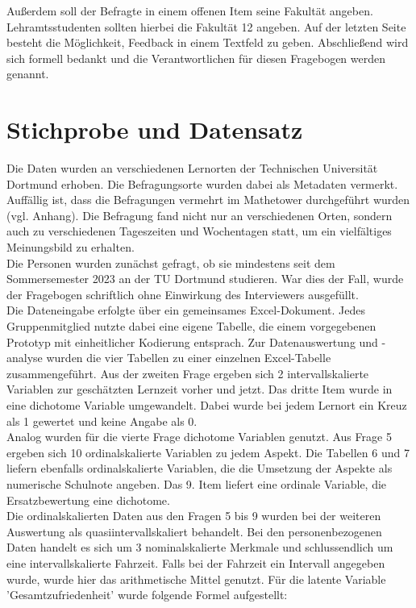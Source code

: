 \documentclass[11pt, a4paper]{article}
\begin{document}
Außerdem soll der Befragte in einem offenen Item seine Fakultät angeben.
Lehramtsstudenten sollten hierbei die Fakultät 12 angeben.
Auf der letzten Seite besteht die Möglichkeit, Feedback in einem Textfeld zu geben.
Abschließend wird sich formell bedankt und die Verantwortlichen für diesen Fragebogen werden genannt.

\newpage
\section{Stichprobe und Datensatz}
\label{Stichprobe und Datensatz}

Die Daten wurden an verschiedenen Lernorten der Technischen Universität Dortmund erhoben. Die Befragungsorte wurden dabei als Metadaten vermerkt. Auffällig ist, dass die Befragungen vermehrt im Mathetower durchgeführt wurden (vgl. Anhang). Die Befragung fand nicht nur an verschiedenen Orten, sondern auch zu verschiedenen Tageszeiten und Wochentagen statt, um ein vielfältiges Meinungsbild zu erhalten.\\

Die Personen wurden zunächst gefragt, ob sie mindestens seit dem Sommersemester 2023 an der TU Dortmund studieren. War dies der Fall, wurde der Fragebogen schriftlich ohne Einwirkung des Interviewers ausgefüllt.\\

Die Dateneingabe erfolgte über ein gemeinsames Excel-Dokument. Jedes Gruppenmitglied nutzte dabei eine eigene Tabelle, die einem vorgegebenen Prototyp mit einheitlicher Kodierung entsprach. Zur Datenauswertung und -analyse wurden die vier Tabellen zu einer einzelnen Excel-Tabelle zusammengeführt. Aus der zweiten Frage ergeben sich 2 intervallskalierte Variablen zur geschätzten Lernzeit vorher und jetzt. Das dritte Item wurde in eine dichotome Variable umgewandelt. Dabei wurde bei jedem Lernort ein Kreuz als 1 gewertet und keine Angabe als 0. \\

Analog wurden für die vierte Frage dichotome Variablen genutzt. Aus Frage 5 ergeben sich 10 ordinalskalierte Variablen zu jedem Aspekt. Die Tabellen 6 und 7 liefern ebenfalls ordinalskalierte Variablen, die die Umsetzung der Aspekte als numerische Schulnote angeben. Das 9. Item liefert eine ordinale Variable, die Ersatzbewertung eine dichotome.\\


Die ordinalskalierten Daten aus den Fragen 5 bis 9 wurden bei der weiteren Auswertung als quasiintervallskaliert behandelt. Bei den personenbezogenen Daten handelt es sich um 3 nominalskalierte Merkmale und schlussendlich um eine intervallskalierte Fahrzeit. Falls bei der Fahrzeit ein Intervall angegeben wurde, wurde hier das arithmetische Mittel genutzt. 
Für die latente Variable 'Gesamtzufriedenheit' wurde folgende Formel aufgestellt:
\end{document}
